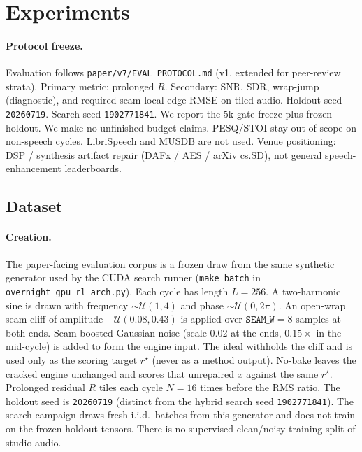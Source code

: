 \section{Experiments}
\label{sec:experiments}

\paragraph{Protocol freeze.}
Evaluation follows \texttt{paper/v7/EVAL\_PROTOCOL.md} (v1, extended for peer-review strata).
Primary metric: prolonged $R$. Secondary: SNR, SDR, wrap-jump (diagnostic), and required seam-local edge RMSE on tiled audio.
Holdout seed \texttt{20260719}. Search seed \texttt{1902771841}.
We report the $5$k-gate freeze plus frozen holdout. We make no unfinished-budget claims. PESQ/STOI stay out of scope on non-speech cycles.
LibriSpeech and MUSDB are not used.
Venue positioning: DSP / synthesis artifact repair (DAFx / AES / arXiv cs.SD), not general speech-enhancement leaderboards.

\subsection{Dataset}
\label{sec:dataset}

\paragraph{Creation.}
The paper-facing evaluation corpus is a frozen draw from the same synthetic generator used by the CUDA search runner (\texttt{make\_batch} in \texttt{overnight\_gpu\_rl\_arch.py}).
Each cycle has length $L{=}256$.
A two-harmonic sine is drawn with frequency $\sim\mathcal{U}(1,4)$ and phase $\sim\mathcal{U}(0,2\pi)$.
An open-wrap seam cliff of amplitude $\pm\mathcal{U}(0.08,0.43)$ is applied over $\texttt{SEAM\_W}{=}8$ samples at both ends.
Seam-boosted Gaussian noise (scale $0.02$ at the ends, $0.15\times$ in the mid-cycle) is added to form the engine input.
The ideal withholds the cliff and is used only as the scoring target $r^{\star}$ (never as a method output).
No-bake leaves the cracked engine unchanged and scores that unrepaired $x$ against the same $r^{\star}$.
Prolonged residual $R$ tiles each cycle $N{=}16$ times before the RMS ratio.
The holdout seed is \texttt{20260719} (distinct from the hybrid search seed \texttt{1902771841}).
The search campaign draws fresh i.i.d.\ batches from this generator and does not train on the frozen holdout tensors.
There is no supervised clean/noisy training split of studio audio.

